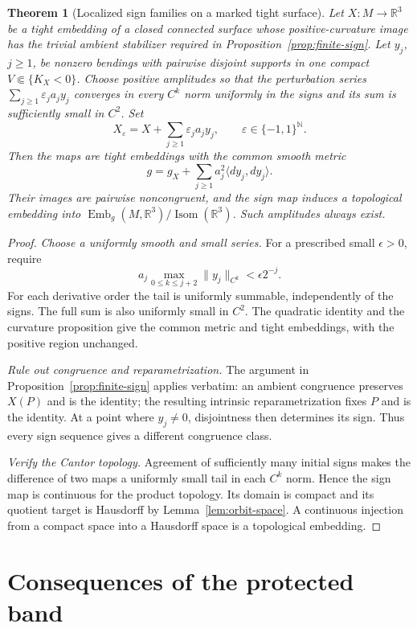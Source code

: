 \documentclass[11pt]{amsart}
\newtheorem{theorem}{Theorem}[section]
\theoremstyle{definition}
\theoremstyle{remark}
\newcommand{\R}{\mathbb R}\newcommand{\Sph}{\mathbb S}
\DeclareMathOperator{\Isom}{Isom}\DeclareMathOperator{\Emb}{Emb}
\numberwithin{equation}{section}
\begin{document}
\begin{theorem}[Localized sign families on a marked tight surface]
\label{thm:localized-sign}
Let $X:M\to\R^3$ be a tight embedding of a closed connected surface
whose positive-curvature image has the trivial ambient stabilizer
required in Proposition~\ref{prop:finite-sign}. Let $y_j$, $j\ge1$,
be nonzero bendings with pairwise disjoint supports in
one compact $V\Subset\{K_X<0\}$. Choose positive amplitudes so that
the perturbation series $\sum_{j\ge1}\varepsilon_ja_jy_j$ converges
in every $C^k$ norm uniformly in the signs and its sum is sufficiently
small in $C^2$. Set
\[
 X_\varepsilon=X+\sum_{j\ge1}\varepsilon_ja_jy_j,
 \qquad\varepsilon\in\{-1,1\}^{\mathbb N}.
\]
Then the maps are tight embeddings with the common smooth metric
\[
 g=g_X+\sum_{j\ge1}a_j^2\langle dy_j,dy_j\rangle.
\]
Their images are pairwise noncongruent, and the sign map induces a
topological embedding into $\Emb_g(M,\R^3)/\Isom(\R^3)$.
Such amplitudes always exist.
\end{theorem}
\begin{proof}
\emph{Choose a uniformly smooth and small series.}
For a prescribed small $\epsilon>0$, require
\[
 a_j\max_{0\le k\le j+2}\|y_j\|_{C^k}<\epsilon2^{-j}.
\]
For each derivative order the tail is uniformly summable, independently
of the signs. The full sum is also uniformly small in $C^2$.
The quadratic identity and the curvature proposition give the common
metric and tight embeddings, with the positive region unchanged.

\emph{Rule out congruence and reparametrization.}
The argument in Proposition~\ref{prop:finite-sign} applies verbatim:
an ambient congruence preserves $X(P)$ and is the identity; the resulting
intrinsic reparametrization fixes $P$ and is the identity. At a point
where $y_j\ne0$, disjointness then determines its sign. Thus every sign
sequence gives a different congruence class.

\emph{Verify the Cantor topology.}
Agreement of sufficiently many initial signs makes the difference of two
maps a uniformly small tail in each $C^k$ norm. Hence the sign map is
continuous for the product topology. Its domain is compact and its
quotient target is Hausdorff by Lemma~\ref{lem:orbit-space}. A continuous
injection from a compact space into a Hausdorff space is a topological
embedding.
\end{proof}

\section{Consequences of the protected band}\label{sec:applications}
\end{document}
